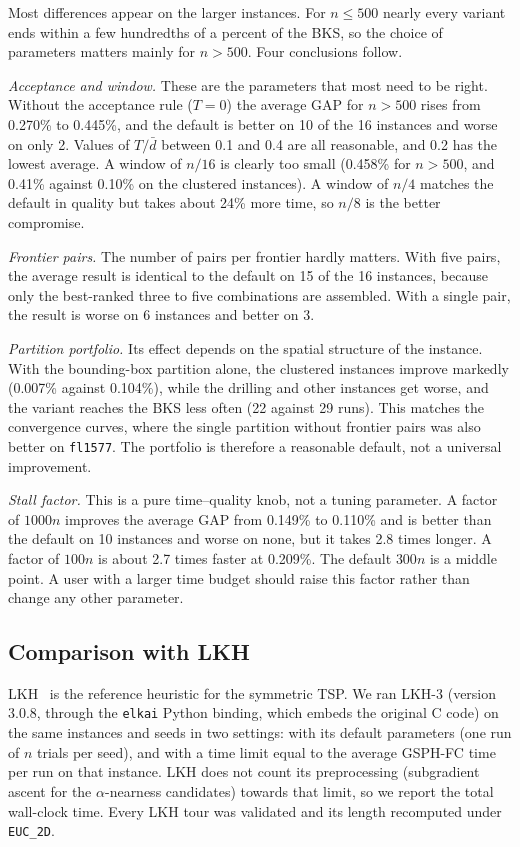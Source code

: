 \documentclass[runningheads]{llncs}
\begin{document}
Most differences appear on the larger instances. For $n\le 500$
nearly every variant ends within a few hundredths of a percent of the
BKS, so the choice of parameters matters mainly for $n>500$. Four
conclusions follow.

\emph{Acceptance and window.} These are the parameters that most need
to be right. Without the acceptance rule ($T=0$) the average GAP for
$n>500$ rises from 0.270\% to 0.445\%, and the default is better on 10
of the 16 instances and worse on only 2. Values of $T/\bar d$ between
0.1 and 0.4 are all reasonable, and 0.2 has the lowest average. A
window of $n/16$ is clearly too small (0.458\% for $n>500$, and 0.41\%
against 0.10\% on the clustered instances). A window of $n/4$ matches
the default in quality but takes about 24\% more time, so $n/8$ is the
better compromise.

\emph{Frontier pairs.} The number of pairs per frontier hardly matters.
With five pairs, the average result is identical to the default on 15
of the 16 instances, because only the best-ranked three to five
combinations are assembled. With a single pair, the result is worse on
6 instances and better on 3.

\emph{Partition portfolio.} Its effect depends on the spatial structure
of the instance. With the bounding-box partition alone, the clustered
instances improve markedly (0.007\% against 0.104\%), while the drilling
and other instances get worse, and the variant reaches the BKS less
often (22 against 29 runs). This matches the convergence curves, where
the single partition without frontier pairs was also better on
\texttt{fl1577}. The portfolio is therefore a reasonable default, not a
universal improvement.

\emph{Stall factor.} This is a pure time--quality knob, not a tuning
parameter. A factor of $1000n$ improves the average GAP from 0.149\% to
0.110\% and is better than the default on 10 instances and worse on
none, but it takes 2.8 times longer. A factor of $100n$ is about 2.7
times faster at 0.209\%. The default $300n$ is a middle point. A user with a
larger time budget should raise this factor rather than change any
other parameter.

\subsection{Comparison with LKH}
\label{sec:lkh}

LKH~\cite{helsgaun2000effective,helsgaun2017extension} is the reference
heuristic for the symmetric TSP. We ran LKH-3 (version 3.0.8, through
the \texttt{elkai} Python binding, which embeds the original C code) on
the same instances and seeds in two settings: with its default
parameters (one run of $n$ trials per seed), and with a time limit equal
to the average GSPH-FC time per run on that instance. LKH does not count
its preprocessing (subgradient ascent for the $\alpha$-nearness
candidates) towards that limit, so we report the total wall-clock time.
Every LKH tour was validated and its length recomputed under
\texttt{EUC\_2D}.
\end{document}
